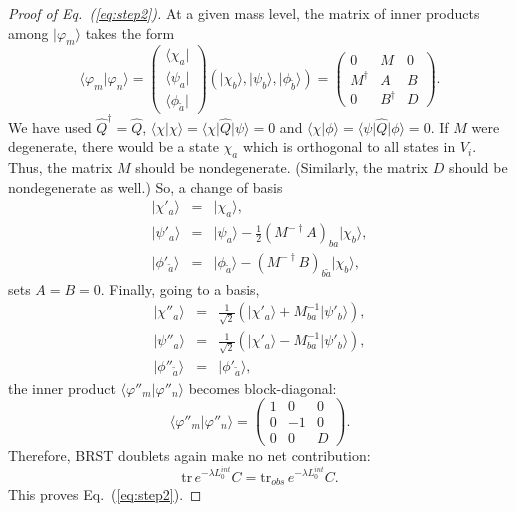 \documentclass[a4paper,12pt]{article}
\newcommand{\bra}[1]{\mbox{$\langle #1 |$}}
\newcommand{\ket}[1]{\mbox{$| #1 \rangle$}}
\newcommand{\norm}[2]{\mbox{$\langle #1 | #2 \rangle$}}
\newcommand{\tr}{\mbox{tr}\,}
\newcommand{\eq}[1]{(\ref{eq:#1})}
\newcommand{\hQ}{\hat{Q}}
\newcommand{\ta}{\tilde{a}}
\newcommand{\tb}{\tilde{b}}
\begin{document}
\begin{proof}[Proof of Eq.~\eq{step2}]
At a given mass level, the matrix of 
inner products among $\ket{\varphi_{m}}$ takes the form
\begin{equation}
%
\norm{\varphi_{m}}{\varphi_{n}}
=
\left(\begin{array}{c}
        \bra{\chi_{a}} \\
        \bra{\psi_{a}} \\
        \bra{\phi_{\ta}}
\end{array}\right)
%
\left( \ket{\chi_{b}}, \ket{\psi_{b}}, \ket{\phi_{\tb}} \right)
=
%
\left( \begin{array}{ccc}
        0 & M & 0 \\
        M^{\dagger} & A & B \\
        0 & B^{\dagger} & D
\end{array} \right).
\label{eq:matrixab}
%
\end{equation}
We have used $\hat{Q}^\dagger = \hat{Q}$,
$ \norm{\chi}{\chi} = \bra{\chi} \hQ \ket{\psi} = 0 $ and
$ \norm{\chi}{\phi} = \bra{\psi} \hQ \ket{\phi} = 0 $.
If $M$ were degenerate, there would be a state $\chi_{a}$ which is orthogonal to all states in $V_{i}$. Thus, the matrix $M$ should be nondegenerate. (Similarly, the matrix $D$ should be nondegenerate as well.) 
So, a change of basis
\begin{eqnarray}
%
\ket{\chi'_{a}} &=& \ket{\chi_{a}},
	\nonumber \\
\ket{\psi'_{a}} &=& \ket{\psi_{a}}
	- \frac{1}{2} (M^{-\dagger} A)_{ba} \ket{\chi_{b}},
	\nonumber \\
\ket{\phi'_{\ta}} &=& \ket{\phi_{\ta}}
	- (M^{-\dagger} B)_{b \ta} \ket{\chi_{b}},
\label{eq:transf1}
%
\end{eqnarray}
sets $A=B=0$. Finally, going to a basis,
\begin{eqnarray}
%
\ket{\chi''_{a}} &=&
	\frac{1}{\sqrt{2}} (\ket{\chi'_{a}}
	+ M^{-1}_{ba} \ket{\psi'_{b}}), \nonumber \\
\ket{\psi''_{a}} &=&
	\frac{1}{\sqrt{2}} (\ket{\chi'_{a}}
	- M^{-1}_{ba} \ket{\psi'_{b}}), \nonumber \\
\ket{\phi''_{\ta}} &=& \ket{\phi'_{\ta}},
\label{eq:transf2}
%
\end{eqnarray}
the inner product $\norm{\varphi''_{m}}{\varphi''_{n}}$ becomes
block-diagonal:
\begin{equation}
%
\norm{\varphi''_{m}}{\varphi''_{n}}
=
        \left( \begin{array}{cccccc}
                1 & 0   & 0 \\
                0 & -1 & 0 \\
                0 & 0   & D
        \end{array} \right).
%
\end{equation}
Therefore, BRST doublets again make no net contribution:
\begin{equation}
%
\tr e^{-\lambda L_{0}^{int}} C
        = \mbox{tr}_{obs} \, e^{-\lambda L_{0}^{int}} C.
%
\end{equation}
This proves Eq.~\eq{step2}.
\end{proof}
\end{document}
